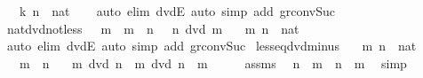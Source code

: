 \begin{isabellebody}
\ \ \ k\ n\ {\isacharcolon}{\kern0pt}{\isacharcolon}{\kern0pt}\ nat\isanewline
%
\isadelimproof
\ \ %
\endisadelimproof
%
\isatagproof
{}\isamarkupfalse%
\ {\isacharparenleft}{\kern0pt}auto\ elim{\isacharbang}{\kern0pt}{\isacharcolon}{\kern0pt}\ dvdE{\isacharparenright}{\kern0pt}\ {\isacharparenleft}{\kern0pt}auto\ simp\ add{\isacharcolon}{\kern0pt}\ gr{}{\isacharunderscore}{\kern0pt}conv{\isacharunderscore}{\kern0pt}Suc{\isacharparenright}{\kern0pt}%
\endisatagproof
{\isafoldproof}%
%
\isadelimproof
\isanewline
%
\endisadelimproof
\isanewline
{}\isamarkupfalse%
\ nat{\isacharunderscore}{\kern0pt}dvd{\isacharunderscore}{\kern0pt}not{\isacharunderscore}{\kern0pt}less{\isacharcolon}{\kern0pt}\ {\isachardoublequoteopen}{}\ {\isacharless}{\kern0pt}\ m\ {\isasymLongrightarrow}\ m\ {\isacharless}{\kern0pt}\ n\ {\isasymLongrightarrow}\ {\isasymnot}\ n\ dvd\ m{\isachardoublequoteclose}\isanewline
\ \ \ m\ n\ {\isacharcolon}{\kern0pt}{\isacharcolon}{\kern0pt}\ nat\isanewline
%
\isadelimproof
\ \ %
\endisadelimproof
%
\isatagproof
{}\isamarkupfalse%
\ {\isacharparenleft}{\kern0pt}auto\ elim{\isacharbang}{\kern0pt}{\isacharcolon}{\kern0pt}\ dvdE{\isacharparenright}{\kern0pt}\ {\isacharparenleft}{\kern0pt}auto\ simp\ add{\isacharcolon}{\kern0pt}\ gr{}{\isacharunderscore}{\kern0pt}conv{\isacharunderscore}{\kern0pt}Suc{\isacharparenright}{\kern0pt}%
\endisatagproof
{\isafoldproof}%
%
\isadelimproof
\isanewline
%
\endisadelimproof
\isanewline
{}\isamarkupfalse%
\ less{\isacharunderscore}{\kern0pt}eq{\isacharunderscore}{\kern0pt}dvd{\isacharunderscore}{\kern0pt}minus{\isacharcolon}{\kern0pt}\isanewline
\ \ \ m\ n\ {\isacharcolon}{\kern0pt}{\isacharcolon}{\kern0pt}\ nat\isanewline
\ \ \ {\isachardoublequoteopen}m\ {\isasymle}\ n{\isachardoublequoteclose}\isanewline
\ \ \ {\isachardoublequoteopen}m\ dvd\ n\ {\isasymlongleftrightarrow}\ m\ dvd\ n\ {\isacharminus}{\kern0pt}\ m{\isachardoublequoteclose}\isanewline
%
\isadelimproof
%
\endisadelimproof
%
\isatagproof
{}\isamarkupfalse%
\ {\isacharminus}{\kern0pt}\isanewline
\ \ \isamarkupfalse%
\ assms\ \isamarkupfalse%
\ {\isachardoublequoteopen}n\ {\isacharequal}{\kern0pt}\ m\ {\isacharplus}{\kern0pt}\ {\isacharparenleft}{\kern0pt}n\ {\isacharminus}{\kern0pt}\ m{\isacharparenright}{\kern0pt}{\isachardoublequoteclose}\ \isamarkupfalse%
\ simp\isanewline
\ \ \isamarkupfalse%

\end{isabellebody}
